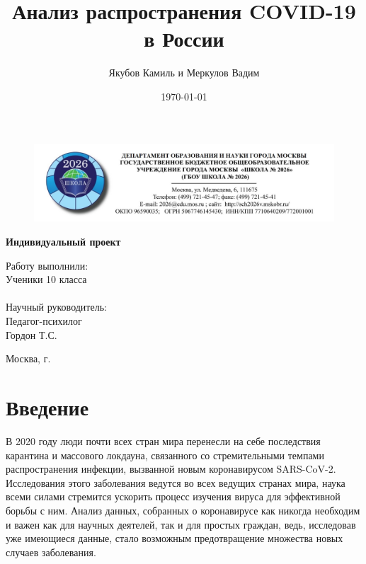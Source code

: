 \documentclass[a4paper, 12pt]{extarticle}
\title{Анализ распространения COVID-19 в России}
\author{Якубов Камиль и Меркулов Вадим}
\date{\today}
\begin{document}
\begin{titlepage}
    \vspace*{0.7cm}
    \begin{center}
        \begin{figure}[h]
            \includegraphics{../plots/title_page_school_logo.jpg}
        \end{figure}
        \vspace{1.5cm}

        \Large{\textbf{
            Индивидуальный проект \\
            \textquote{\thetitle}}
        }
    \end{center}
    \vspace{5cm}

    \begin{flushright}
        Работу выполнили:\\ \vspace{7pt}
        Ученики 10  класса\\ \vspace{7pt}
        \theauthor\\ \vspace{1cm}
        Научный руководитель:\\ \vspace{7pt}
        Педагог-психилог\\ \vspace{7pt}
        Гордон Т.С.
    \end{flushright}
    \vfill
    \centering
    Москва, {\the\year} г.

\end{titlepage}

\tableofcontents
\newpage

\section{Введение}

В 2020 году люди почти всех стран мира перенесли на себе последствия карантина
и массового локдауна, связанного со стремительными темпами распространения
инфекции, вызванной новым коронавирусом SARS-CoV-2. Исследования этого
заболевания ведутся во всех ведущих странах мира, наука всеми силами стремится
ускорить процесс изучения вируса для эффективной борьбы с ним. Анализ данных,
собранных о коронавирусе как никогда необходим и важен как для научных
деятелей, так и для простых граждан, ведь, исследовав уже имеющиеся данные,
стало возможным предотвращение множества новых случаев заболевания.
\\
\end{document}
